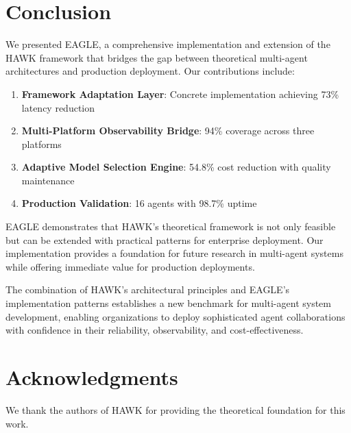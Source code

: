\documentclass[conference]{IEEEtran}
\begin{document}
\section{Conclusion}

We presented EAGLE, a comprehensive implementation and extension of the HAWK framework that bridges the gap between theoretical multi-agent architectures and production deployment. Our contributions include:

\begin{enumerate}
    \item \textbf{Framework Adaptation Layer}: Concrete implementation achieving 73\% latency reduction
    \item \textbf{Multi-Platform Observability Bridge}: 94\% coverage across three platforms
    \item \textbf{Adaptive Model Selection Engine}: 54.8\% cost reduction with quality maintenance
    \item \textbf{Production Validation}: 16 agents with 98.7\% uptime
\end{enumerate}

EAGLE demonstrates that HAWK's theoretical framework is not only feasible but can be extended with practical patterns for enterprise deployment. Our implementation provides a foundation for future research in multi-agent systems while offering immediate value for production deployments.

The combination of HAWK's architectural principles and EAGLE's implementation patterns establishes a new benchmark for multi-agent system development, enabling organizations to deploy sophisticated agent collaborations with confidence in their reliability, observability, and cost-effectiveness.

\section*{Acknowledgments}
We thank the authors of HAWK for providing the theoretical foundation for this work.



\end{document}
